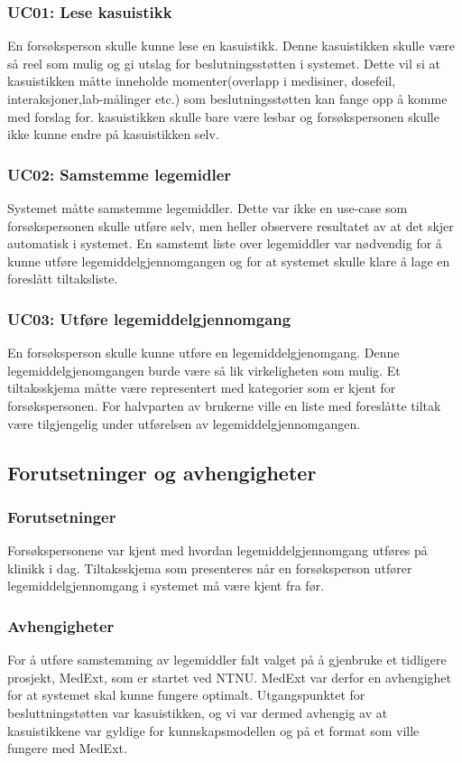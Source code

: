 \subsubsection{UC01: Lese kasuistikk}
En forsøksperson skulle kunne lese en kasuistikk. Denne kasuistikken skulle være så reel som mulig og gi utslag for beslutningsstøtten i systemet. Dette vil si at kasuistikken måtte inneholde momenter(overlapp i medisiner, dosefeil, interaksjoner,lab-målinger etc.) som beslutningsstøtten kan fange opp å komme med forslag for. kasuistikken skulle bare være lesbar og forsøkspersonen skulle ikke kunne endre på kasuistikken selv. 
\subsubsection{UC02: Samstemme legemidler}
Systemet måtte samstemme legemiddler. Dette var ikke en use-case som forsøkspersonen skulle utføre selv, men heller observere resultatet av at det skjer automatisk i systemet. En samstemt liste over legemiddler var nødvendig for å kunne utføre legemiddelgjennomgangen og for at systemet skulle klare å lage en foreslått tiltaksliste.
\subsubsection{UC03: Utføre legemiddelgjennomgang}
En forsøksperson skulle kunne utføre en legemiddelgjenomgang. Denne legemiddelgjenomgangen burde være så lik virkeligheten som mulig. Et tiltaksskjema måtte være representert med kategorier som er kjent for forsøkspersonen. For halvparten av brukerne ville en liste med foreslåtte tiltak være tilgjengelig under utførelsen av legemiddelgjennomgangen.
\subsection{Forutsetninger og avhengigheter}
\subsubsection{Forutsetninger}
Forsøkspersonene var kjent med hvordan legemiddelgjennomgang utføres på klinikk i dag. Tiltaksskjema som presenteres når en forsøksperson utfører legemiddelgjennomgang i systemet må være kjent fra før.
\subsubsection{Avhengigheter}
For å utføre samstemming av legemiddler falt valget på å gjenbruke et tidligere prosjekt, MedExt, som er startet ved NTNU.\citep{rost2014development} MedExt var derfor en avhengighet for at systemet skal kunne fungere optimalt. Utgangspunktet for besluttningstøtten var kasuistikken, og vi var dermed avhengig av at kasuistikkene var gyldige for kunnskapsmodellen og på et format som ville fungere med MedExt.

